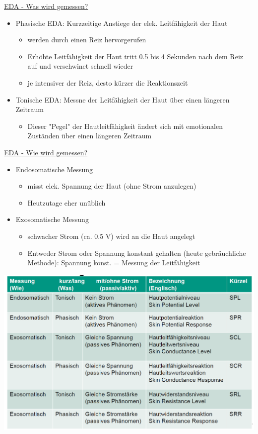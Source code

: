 \documentclass[a4paper,10pt,oneside]{article}
\begin{document}
\underline{EDA - Was wird gemessen?} \\
	\begin{itemize}
		\item Phasische EDA: Kurzzeitige Anstiege der elek. Leitfähigkeit der Haut
			\begin{itemize}
				\item werden durch einen Reiz hervorgerufen
				\item Erhöhte Leitfähigkeit der Haut tritt 0.5 bis 4 Sekunden nach dem Reiz auf und verschwinet schnell wieder
				\item je intensiver der Reiz, desto kürzer die Reaktionszeit
			\end{itemize}
		\item Tonische EDA: Messne der Leitfähigkeit der Haut über einen längeren Zeitraum 
			\begin{itemize}
				\item Dieser "Pegel" der Hautleitfähigkeit ändert sich mit emotionalen Zuständen über einen längeren Zeitraum
			\end{itemize}
	\end{itemize}
	
\underline{EDA - Wie wird gemessen?} \\
	\begin{itemize}
		\item Endosomatische Messung
			\begin{itemize}
				\item misst elek. Spannung der Haut (ohne Strom anzulegen)
				\item Heutzutage eher unüblich
			\end{itemize}
		\item Exosomatische Messung
			\begin{itemize}
				\item schwacher Strom (ca. 0.5 V) wird an
				die Haut angelegt
				\item Entweder Strom oder Spannung konstant gehalten (heute gebräuchliche Methode): Spannung konst. = Messung der Leitfähigkeit
			\end{itemize}
	\end{itemize}
 	
\includegraphics[scale=0.2]{Grafiken/1726.png}
\end{document}
